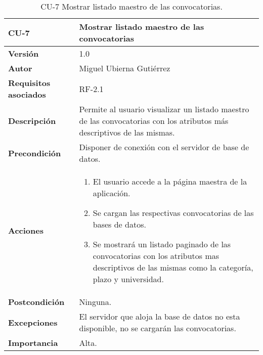 \begin{table}[p]
	\centering
	\begin{tabularx}{\linewidth}{ p{} p{} }
		\toprule
		\textbf{CU-7}    & \textbf{Mostrar listado maestro de las convocatorias}\\
		\toprule
		\textbf{Versión}              & 1.0    \\
		\textbf{Autor}                & Miguel Ubierna Gutiérrez \\
		\textbf{Requisitos asociados} & RF-2.1 \\
		\textbf{Descripción}          & Permite al usuario visualizar un listado maestro de las convocatorias con los atributos más descriptivos de las mismas.  \\
		\textbf{Precondición}         & Disponer  de conexión con el servidor de base de datos.\\
		\textbf{Acciones}             &
		\begin{enumerate}
			\def\labelenumi{\arabic{enumi}.}
			\tightlist
			\item El usuario accede a la página maestra de la aplicación.
                \item Se cargan las respectivas convocatorias de las bases de datos.
			\item Se mostrará un listado paginado de las convocatorias con los atributos mas descriptivos de las mismas como la categoría, plazo y universidad.
		\end{enumerate}\\
		\textbf{Postcondición}        & Ninguna. \\
		\textbf{Excepciones}          & El servidor que aloja la base de datos no esta disponible, no se cargarán las convocatorias.  \\
		\textbf{Importancia}          & Alta.  \\
		\bottomrule
	\end{tabularx}
	\caption{CU-7 Mostrar listado maestro de las convocatorias.}
\end{table}


